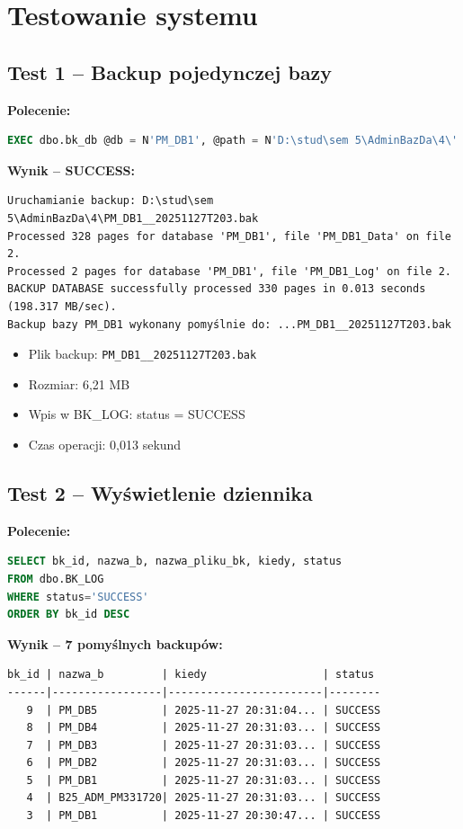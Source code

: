\documentclass[a4paper,11pt]{article}
\begin{document}
	\section{Testowanie systemu}
	
	\subsection{Test 1 -- Backup pojedynczej bazy}
	
	\textbf{Polecenie:}
	\begin{lstlisting}[language=SQL]
EXEC dbo.bk_db @db = N'PM_DB1', @path = N'D:\stud\sem 5\AdminBazDa\4\'
	\end{lstlisting}
	
	\textbf{Wynik -- SUCCESS:}
	\begin{lstlisting}
Uruchamianie backup: D:\stud\sem 5\AdminBazDa\4\PM_DB1__20251127T203.bak
Processed 328 pages for database 'PM_DB1', file 'PM_DB1_Data' on file 2.
Processed 2 pages for database 'PM_DB1', file 'PM_DB1_Log' on file 2.
BACKUP DATABASE successfully processed 330 pages in 0.013 seconds (198.317 MB/sec).
Backup bazy PM_DB1 wykonany pomyślnie do: ...PM_DB1__20251127T203.bak
	\end{lstlisting}
	
	\begin{itemize}
		\item Plik backup: \texttt{PM\_DB1\_\_20251127T203.bak}
		\item Rozmiar: 6,21 MB
		\item Wpis w BK\_LOG: status = SUCCESS
		\item Czas operacji: 0,013 sekund
	\end{itemize}
	
	\subsection{Test 2 -- Wyświetlenie dziennika}
	
	\textbf{Polecenie:}
	\begin{lstlisting}[language=SQL]
SELECT bk_id, nazwa_b, nazwa_pliku_bk, kiedy, status
FROM dbo.BK_LOG
WHERE status='SUCCESS'
ORDER BY bk_id DESC
	\end{lstlisting}
	
	\textbf{Wynik -- 7 pomyślnych backupów:}
	\begin{lstlisting}
bk_id | nazwa_b         | kiedy                  | status
------|-----------------|------------------------|--------
   9  | PM_DB5          | 2025-11-27 20:31:04... | SUCCESS
   8  | PM_DB4          | 2025-11-27 20:31:03... | SUCCESS
   7  | PM_DB3          | 2025-11-27 20:31:03... | SUCCESS
   6  | PM_DB2          | 2025-11-27 20:31:03... | SUCCESS
   5  | PM_DB1          | 2025-11-27 20:31:03... | SUCCESS
   4  | B25_ADM_PM331720| 2025-11-27 20:31:03... | SUCCESS
   3  | PM_DB1          | 2025-11-27 20:30:47... | SUCCESS
	\end{lstlisting}
	
\end{document}
